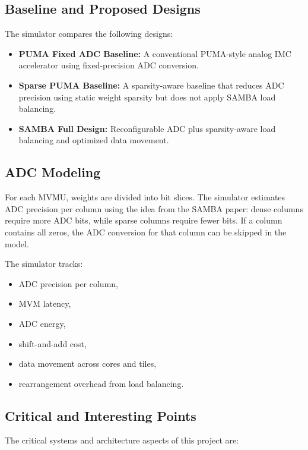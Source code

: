 \documentclass[11pt]{article}
\begin{document}
\subsection{Baseline and Proposed Designs}

The simulator compares the following designs:

\begin{itemize}
    \item \textbf{PUMA Fixed ADC Baseline:} A conventional PUMA-style analog IMC accelerator using fixed-precision ADC conversion.
    \item \textbf{Sparse PUMA Baseline:} A sparsity-aware baseline that reduces ADC precision using static weight sparsity but does not apply SAMBA load balancing.
    \item \textbf{SAMBA Full Design:} Reconfigurable ADC plus sparsity-aware load balancing and optimized data movement.
\end{itemize}

\subsection{ADC Modeling}

For each MVMU, weights are divided into bit slices. The simulator estimates ADC precision per column using the idea from the SAMBA paper: dense columns require more ADC bits, while sparse columns require fewer bits. If a column contains all zeros, the ADC conversion for that column can be skipped in the model.

The simulator tracks:

\begin{itemize}
    \item ADC precision per column,
    \item MVM latency,
    \item ADC energy,
    \item shift-and-add cost,
    \item data movement across cores and tiles,
    \item rearrangement overhead from load balancing.
\end{itemize}

\subsection{Critical and Interesting Points}

The critical systems and architecture aspects of this project are:
\end{document}
